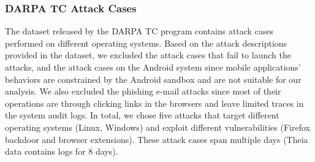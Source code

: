 \subsubsection{DARPA TC Attack Cases}
The dataset released by the DARPA TC program contains attack cases performed on different operating systems.
Based on the attack descriptions provided in the dataset, we excluded the attack cases that fail to launch the attacks, and the attack cases on the Android system since mobile applications' behaviors are constrained by the Android sandbox and are not suitable for our analysis.
We also excluded the phishing e-mail attacks since most of their operations are through clicking links in the browsers and leave limited traces in the system audit logs.
In total, we chose five attacks that target different operating systems (Linux, Windows) and exploit different vulnerabilities (Firefox backdoor and browser extensions).
These attack cases span multiple days (\eg Theia data contains logs for 8 days).

